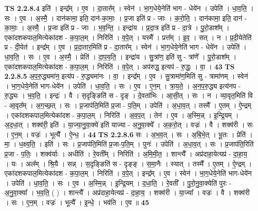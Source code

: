 \documentclass[17pt]{extarticle}
\begin{document}
                  \newline
                                \textbf{ TS 2.2.8.4} \newline
                  इति॑ । इन्द्र᳚म् । ए॒व । दा॒तार᳚म् । स्वेन॑ । भा॒ग॒धेये॒नेति॑ भाग - धेये॑न । उपेति॑ । धा॒व॒ति॒ । सः । ए॒व । अ॒स्मै॒ । दान॑कामा॒ इति॒ दान॑-का॒माः॒ । प्र॒जा इति॑ प्र - जाः । क॒रो॒ति॒ । दान॑कामा॒ इति॒ दान॑ - का॒माः॒ । अ॒स्मै॒ । प्र॒जा इति॑ प्र - जाः । भ॒व॒न्ति॒ । इन्द्रा॑य । प्र॒दा॒त्र इति॑ प्र - दा॒त्रे । पु॒रो॒डाश᳚म् । एका॑दशकपाल॒मित्येका॑दश - क॒पा॒ल॒म् । निरिति॑ । व॒पे॒त् । यस्मै᳚ । प्रत्त᳚म् । इ॒व॒ । सत् । न । प्र॒दी॒येतेति॑ प्र - दी॒येत॑ । इन्द्र᳚म् । ए॒व । प्र॒दा॒तार॒मिति॑ प्र - दा॒तार᳚म् । स्वेन॑ । भा॒ग॒धेये॒नेति॑ भाग - धेये॑न । उपेति॑ । धा॒व॒ति॒ । सः । ए॒व । अ॒स्मै॒ । प्रेति॑ । दा॒प॒य॒ति॒ । इन्द्रा॑य । सु॒त्रांण॒ इति॑ सु - त्रांणे᳚ । पु॒रो॒डाश᳚म् । एका॑दशकपाल॒मित्येका॑दश - क॒पा॒ल॒म् । निरिति॑ । व॒पे॒त् । अप॑रुद्ध॒ इत्यप॑ - रु॒द्धः॒ । वा॒ । \textbf{  43} \newline
                  \newline
                                \textbf{ TS 2.2.8.5} \newline
                  अ॒प॒रु॒द्ध्यमा॑न॒ इत्य॑प - रु॒द्ध्यमा॑नः । वा॒ । इन्द्र᳚म् । ए॒व । सु॒त्रामा॑ण॒मिति॑ सु - त्रामा॑णम् । स्वेन॑ । भा॒ग॒धेये॒नेति॑ भाग-धेये॑न । उपेति॑ । धा॒व॒ति॒ । सः । ए॒व । ए॒न॒म् । त्रा॒य॒ते॒ । अ॒न॒प॒रु॒द्ध्य इत्य॑नप - रु॒द्ध्यः । भ॒व॒ति॒ । इन्द्रः॑ । वै । स॒दृङ्ङिति॑ स - दृङ् । दे॒वता॑भिः । आ॒सी॒त् । सः । न । व्या॒वृत॒मिति॑ वि - आ॒वृत᳚म् । अ॒ग॒च्छ॒त् । सः । प्र॒जाप॑ति॒मिति॑ प्र॒जा - प॒ति॒म् । उपेति॑ । अ॒धा॒व॒त् । तस्मै᳚ । ए॒तम् । ऐ॒न्द्रम् । एका॑दशकपाल॒मित्येका॑दश - क॒पा॒ल॒म् । निरिति॑ । अ॒व॒प॒त् । तेन॑ । ए॒व । अ॒स्मि॒न्न् । इ॒न्द्रि॒यम् । अ॒द॒धा॒त् । शक्व॑री॒ इति॑ । या॒ज्या॒नु॒वा॒क्ये॑ इति॑ याज्या - अ॒नु॒वा॒क्ये᳚ । अ॒क॒रो॒त् । वज्रः॑ । वै । शक्व॑री । सः । ए॒न॒म् । वज्रः॑ । भूत्यै᳚ । ऐ॒न्ध॒ । \textbf{  44} \newline
                  \newline
                                \textbf{ TS 2.2.8.6} \newline
                  सः । अ॒भ॒व॒त् । सः । अ॒बि॒भे॒त् । भू॒तः । प्रेति॑ । मा॒ । ध॒क्ष्य॒ति॒ । इति॑ । सः । प्र॒जाप॑ति॒मिति॑ प्र॒जा-प॒ति॒म् । पुनः॑ । उपेति॑ । अ॒धा॒व॒त् । सः । प्र॒जाप॑ति॒रिति॑ प्र॒जा - प॒तिः॒ । शक्व॑र्याः । अधीति॑ । रे॒वती᳚म् । निरिति॑ । अ॒मि॒मी॒त॒ । शान्त्यै᳚ । अप्र॑दाहा॒येत्यप्र॑ - दा॒हा॒य॒ । यः । अल᳚म् । श्रि॒यै । सन्न् । स॒दृङ्ङिति॑ स - दृङ्ङ् । स॒मा॒नैः । स्यात् । तस्मै᳚ । ए॒तम् । ऐ॒न्द्रम् । एका॑दशकपाल॒मित्येका॑दश - क॒पा॒ल॒म् । निरिति॑ । व॒पे॒त् । इन्द्र᳚म् । ए॒व । स्वेन॑ । भा॒ग॒धेये॒नेति॑ भाग-धेये॑न । उपेति॑ । धा॒व॒ति॒ । सः । ए॒व । अ॒स्मि॒न्न् । इ॒न्द्रि॒यम् । द॒धा॒ति॒ । रे॒वती᳚ । पु॒रो॒नु॒वा॒क्येति॑ पुरः - अ॒नु॒वा॒क्या᳚ । भ॒व॒ति॒ ( ) । शान्त्यै᳚ । अप्र॑दाहा॒येत्यप्र॑ - दा॒हा॒य॒ । शक्व॑री । या॒ज्या᳚ । वज्रः॑ । वै । शक्व॑री । सः । ए॒न॒म् । वज्रः॑ । भूत्यै᳚ । इ॒न्धे॒ । भव॑ति । ए॒व ॥ \textbf{  45 } \newline
\end{document}
